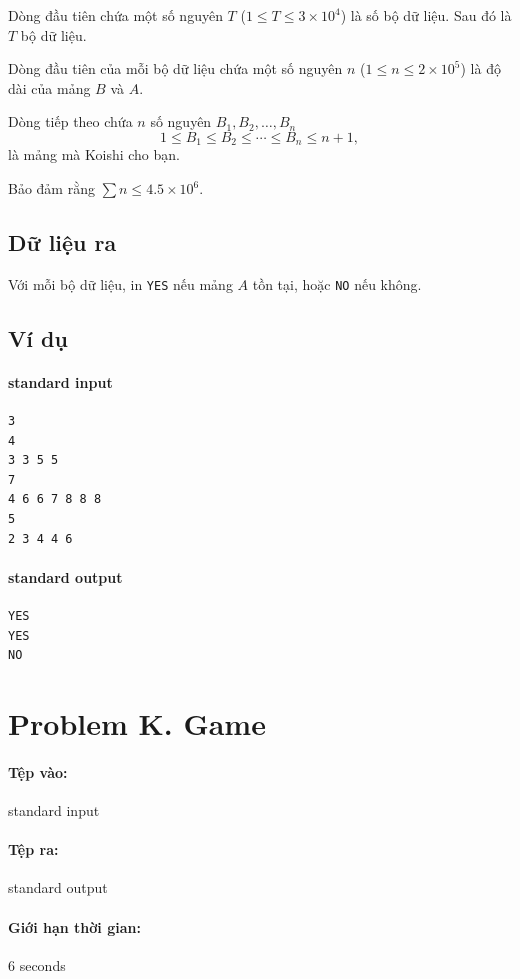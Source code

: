 \documentclass[11pt]{article}
\begin{document}
Dòng đầu tiên chứa một số nguyên \(T\) (\(1\le T\le 3\times 10^4\)) là số bộ
dữ liệu. Sau đó là \(T\) bộ dữ liệu.

Dòng đầu tiên của mỗi bộ dữ liệu chứa một số nguyên \(n\) (\(1\le n\le
2\times 10^5\)) là độ dài của mảng \(B\) và \(A\).

Dòng tiếp theo chứa \(n\) số nguyên \(B_1,B_2,\ldots,B_n\)
\[
  1\le B_1\le B_2\le \cdots\le B_n\le n+1,
\]
là mảng mà Koishi cho bạn.

Bảo đảm rằng \(\sum n\le 4.5\times 10^6\).

\subsection*{Dữ liệu ra}

Với mỗi bộ dữ liệu, in \texttt{YES} nếu mảng \(A\) tồn tại, hoặc \texttt{NO}
nếu không.

\subsection*{Ví dụ}

\paragraph{standard input}
\begin{verbatim}
3
4
3 3 5 5
7
4 6 6 7 8 8 8
5
2 3 4 4 6
\end{verbatim}

\paragraph{standard output}
\begin{verbatim}
YES
YES
NO
\end{verbatim}

\section{Problem K. Game}

\paragraph{Tệp vào:} standard input
\paragraph{Tệp ra:} standard output
\paragraph{Giới hạn thời gian:} 6 seconds
\end{document}
